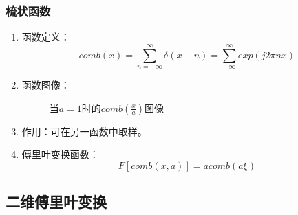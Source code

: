 \documentclass[twocolumn]{ctexart}
\begin{document}
\subsubsection{梳状函数}
\begin{enumerate}
    \item
          函数定义：
          \begin{equation}
              comb\left(x\right) = \sum ^{\infty} _{n=-\infty} \delta\left(x-n\right)=\sum ^{\infty} _{-\infty} exp\left(j2\pi nx\right)
              \nonumber
          \end{equation}
    \item
          函数图像：
          \begin{figure}[H]
              \caption{当$a=1$时的$comb\left(\frac{x}{a}\right)$图像}
          \end{figure}
    \item
          作用：可在另一函数中取样。
    \item
          傅里叶变换函数：
          \begin{equation}
              F\left[ comb\left(x,a\right) \right]=acomb\left(a\xi\right)
              \nonumber
          \end{equation}
\end{enumerate}

\subsection{二维傅里叶变换}
\end{document}
